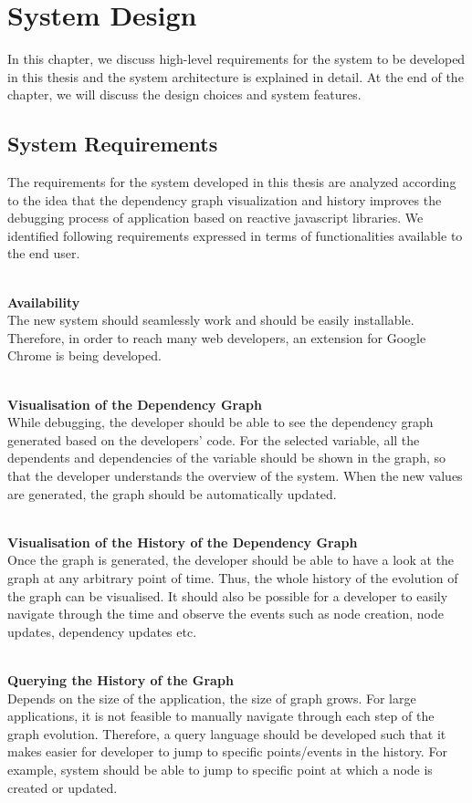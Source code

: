 \chapter{System Design} \label{chap:System Design}
In this chapter, we discuss high-level requirements for the system to be developed in this thesis and the system architecture is explained in detail. 
At the end of the chapter, we will discuss the design choices and system features.

\section{System Requirements}
The requirements for the system developed in this thesis are analyzed according to the idea that the dependency graph visualization and history improves the debugging process of application based on reactive javascript libraries. We identified following requirements expressed in terms of functionalities available to the end user.

\leavevmode
\\
\textbf{Availability}
\\
The new system should seamlessly work and should be easily installable. Therefore, in order to reach many web developers, an extension for Google Chrome is being developed. 

\leavevmode
\\
\textbf{Visualisation of the Dependency Graph}
\\
While debugging, the developer should be able to see the dependency graph generated based on the developers' code. For the selected variable, all the dependents and dependencies of the variable should be shown in the graph, so that the developer understands the overview of the system. 
When the new values are generated, the graph should be automatically updated.

\leavevmode
\\
\textbf{Visualisation of the History of the Dependency Graph}
\\
Once the graph is generated, the developer should be able to have a look at the graph at any arbitrary point of time. Thus, the whole history of the evolution of the graph can be visualised. It should also be possible for a developer to easily navigate through the time and observe the events such as node creation, node updates, dependency updates etc.

\leavevmode
\\
\textbf{Querying the History of the Graph}
\\
Depends on the size of the application, the size of graph grows. For large applications, it is not feasible to manually navigate through each step of the graph evolution. Therefore, a query language should be developed such that it makes easier for developer to jump to specific points/events in the history. For example, system should be able to jump to specific point at which a node is created or updated.


